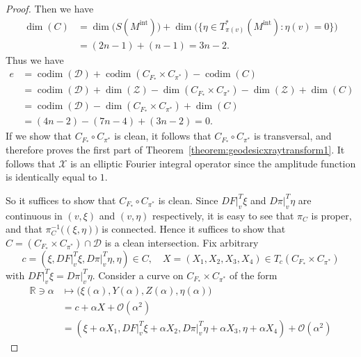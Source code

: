 \documentclass[a4paper,11pt,reqno]{amsart}
\numberwithin{equation}{section}
\theoremstyle{definition}
\theoremstyle{remark}
\begin{document}
\begin{proof}
Then we have 
%
%
\begin{align*}
  \operatorname{dim}(C)
& =
  \operatorname{dim}\bigl(S(M^\text{int})\bigr)
  +
  \operatorname{dim}\bigl(\{\eta \in T^\ast_{\pi(v)}(M^\text{int}): \eta(v)=0\}\bigr)
\\
& =
  (2n-1)+(n-1)
  =
  3n-2. 
\end{align*}
%
%
Thus we have 
%
%
\begin{align*}
  e
& =
  \operatorname{codim}(\mathcal{D})
  +
  \operatorname{codim}(C_{F_\ast}{\times}C_{\pi^\ast})
  -
  \operatorname{codim}(C)
\\
& =
  \operatorname{codim}(\mathcal{D})
  +
  \operatorname{dim}(\mathcal{Z})
  -
  \operatorname{dim}(C_{F_\ast}{\times}C_{\pi^\ast})
  -
  \operatorname{dim}(\mathcal{Z})
  +
  \operatorname{dim}(C)   
\\
& =
  \operatorname{codim}(\mathcal{D})
  -
  \operatorname{dim}(C_{F_\ast}{\times}C_{\pi^\ast})
  +
  \operatorname{dim}(C)
\\
& =
  (4n-2)-(7n-4)+(3n-2)=0.
\end{align*}
%
%
If we show that $C_{F_\ast}{\circ}C_{\pi^\ast}$ is clean, 
it follows that $C_{F_\ast}{\circ}C_{\pi^\ast}$ is transversal, and therefore  
\cite[Theorem~25.2.3]{Hoermander4} proves the first part of Theorem~\ref{theorem:geodesicxraytransform1}. 
It follows that $\mathcal{X}$ is an elliptic Fourier integral operator 
since the amplitude function is identically equal to $1$.   
%
%
\par
%
%
So it suffices to show that $C_{F_\ast}{\circ}C_{\pi^\ast}$ is clean. 
Since $DF\vert^T_v\xi$ and $D\pi\vert^T_v\eta$ are continuous in $(v,\xi)$ and $(v,\eta)$ respectively, 
it is easy to see that $\pi_C$ is proper, and that $\pi_C^{-1}\bigl((\xi,\eta)\bigr)$ is connected. 
Hence it suffices to show that $C=(C_{F_\ast}{\times}C_{\pi^\ast})\cap\mathcal{D}$ is a clean intersection. 
Fix arbitrary 
%
%
$$
c=(\xi,DF\vert^T_v\xi,D\pi\vert^T_v\eta,\eta) \in C,
\quad
X=(X_1,X_2,X_3,X_4) \in T_c(C_{F_\ast}{\times}C_{\pi^\ast})
$$ 
%
%
with $DF\vert^T_v\xi=D\pi\vert^T_v\eta$. 
Consider a curve on $C_{F_\ast}{\times}C_{\pi^\ast}$ of the form
%
%
\begin{align*}
  \mathbb{R}\ni\alpha 
& \mapsto
  \bigl(\xi(\alpha),Y(\alpha),Z(\alpha),\eta(\alpha)\bigr)
\\
& =
  c+\alpha{X}+\mathcal{O}(\alpha^2)
\\
& =
  (\xi+\alpha{X}_1,DF\vert^T_v\xi+\alpha{X_2},D\pi\vert^T_v\eta+\alpha{X_3},\eta+\alpha{X_4})
  +
  \mathcal{O}(\alpha^2)
\end{align*}

\end{proof}
\end{document}
